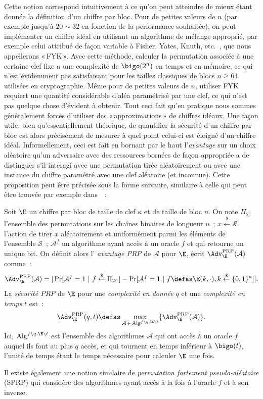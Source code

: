 Cette notion correspond intuitivement à ce qu'on peut atteindre de mieux étant donnée la définition d'un chiffre par bloc.
Pour de petites valeurs de $n$ (par exemple jusqu'à $20 \sim 32$ en fonction de la performance souhaitée), on peut
implémenter un chiffre idéal en utilisant un algorithme de mélange approprié, par exemple celui attribué de façon
variable à Fisher, Yates, Knuth, etc.~\cite{uniform_shuffle}, que nous appellerons «\,FYK\,».
Avec cette méthode, calculer la permutation associée à une certaine clef fixe a une complexité de
$\bigo(2^n)$ en temps et en mémoire, ce qui n'est
évidemment pas satisfaisant pour les tailles classiques de blocs $n \geq 64$ utilisées en cryptographie.
Même pour de petites valeurs de $n$, utiliser FYK requiert une quantité considérable d'aléa paramétrisé par une clef,
ce qui n'est pas quelque chose d'évident à obtenir. 
Tout ceci fait qu'en pratique nous sommes généralement forcés d'utiliser des «\,approximations\,» de chiffres idéaux.
Une façon utile, bien qu'essentiellement théorique, de quantifier la sécurité d'un chiffre par bloc est alors précisément
de mesurer à quel point celui-ci est éloigné d'un chiffre idéal.
Informellement, ceci est fait en bornant par le haut l'\emph{avantage} sur un choix aléatoire qu'un adversaire
avec des ressources bornées de façon appropriée a de distinguer s'il interagi avec une permutation tirée aléatoirement
ou avec une instance du chiffre paramétré avec une clef aléatoire (et inconnue). Cette proposition peut être précisée
sous la forme suivante, similaire à celle qui peut être trouvée par exemple dans~\cite{DBLP:journals/jcss/BellareKR00}~:

\begin{fdefi}
Soit $\E$ un chiffre par bloc de taille de clef $\kappa$ et de taille de bloc $n$.
On note 
$\Pi_{2^n}$ l'ensemble des permutations sur les chaînes binaires de longueur $n$~; $x \overset{\$}{\leftarrow} \mathcal{S}$
l'action de tirer $x$ aléatoirement et uniformément parmi les éléments de l'ensemble $\mathcal{S}$~; $\mathcal{A}^{f}$
un algorithme ayant accès à un oracle $f$ et qui retourne un unique bit.
On définit alors 
l' \emph{avantage PRP} de $\mathcal{A}$ pour $\E$, écrit $\Adv^{\text{PRP}}_{\E}(\mathcal{A})$ comme~:
\[
\Adv^{\text{PRP}}_{\E}(\mathcal{A}) = |\Pr[\mathcal{A}^f = 1~|~f \overset{\$}{\leftarrow} \Pi_{2^n}] - \Pr[\mathcal{A}^f = 1~|~f \defas \E(k,\cdot), k \overset{\$}{\leftarrow} \{0,1\}^\kappa]|.
\]
La \emph{sécurité PRP} de $\E$ pour une \emph{complexité en donnée} $q$ et une \emph{complexité en temps} $t$ est~:
\[
\Adv^{\text{PRP}}_{\E}(q,t) \defas \max_{\mathcal{A}\,\in\,\text{Alg}^{f\backslash q, \E\backslash t}} \{\Adv^{\text{PRP}}_{\E}(\mathcal{A})\}.
\]
Ici, 
$\text{Alg}^{f\backslash q, \E\backslash t}$ est l'ensemble des algorithmes $\mathcal{A}$ qui ont accès à un oracle $f$ auquel ils font au plus $q$ accès,
et qui tournent en temps inférieur à
$\bigo(t)$, l'unité de temps étant le temps nécessaire pour calculer $\E$ une fois.
\label{def:fprp}
\end{fdefi}
Il existe également une notion similaire de \emph{permutation fortement pseudo-aléatoire} (SPRP) qui considère des algorithmes ayant accès à la fois à l'oracle $f$ et à son inverse.

